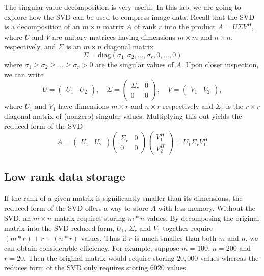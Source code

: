 

The singular value decomposition is very useful.  In this lab, we are going to explore how the SVD can be used to compress image data.  
Recall that the SVD is a decomposition of an $m \times n$ matrix $A$
of rank $r$ into the product $A = U \Sigma V^H$, where $U$ and $V$
are unitary matrices having dimensions $m \times m$ and $n \times n$,
respectively, and $\Sigma$ is an $m \times n$ diagonal matrix
\begin{equation*}
\Sigma = \mbox{diag}(\sigma_1,\sigma_2,\ldots,\sigma_r,0,\ldots,0)
\end{equation*}
where $\sigma_1 \geq \sigma_2 \geq \ldots \geq \sigma_r > 0$ are the
singular values of $A$.  Upon closer inspection, we can write
\begin{equation*}
U = \begin{pmatrix}U_1 & U_2\end{pmatrix}, \quad \Sigma =
\begin{pmatrix}\Sigma_r & 0\\0 & 0\end{pmatrix}, \quad V =
\begin{pmatrix}V_1 & V_2\end{pmatrix},
\end{equation*}
where $U_1$ and $V_1$ have dimensions $m\times r$ and $n\times r$
respectively and $\Sigma_r$ is the $r\times r$ diagonal matrix of
(nonzero) singular values.  Multiplying this out yields the reduced
form of the SVD
\begin{equation*}
A =
\begin{pmatrix}U_1 & U_2\end{pmatrix}
\begin{pmatrix}\Sigma_r & 0\\0 & 0\end{pmatrix}
\begin{pmatrix}V^H_1 \\ V^H_2\end{pmatrix} =
U_1 \Sigma_r V_1^H
\end{equation*}

\subsection*{Low rank data storage}
If the rank of a given matrix is significantly smaller than its
dimensions, the reduced form of the SVD offers a way to store $A$ with less memory.
Without the SVD, an $m\times n$ matrix requires storing $m*n$ values.
By decomposing the original matrix into the SVD reduced form, $U_1$, $\Sigma_r$ and $V_1$ together require $(m*r)+r+(n*r)$ values.
  Thus if $r$ is much smaller than both $m$ and $n$,
we can obtain considerable efficiency.  For example, suppose
$m=100$, $n=200$ and $r=20$. 
Then the original matrix would require storing $20,000$ values whereas the reduces form of the SVD only requires storing $6020$ values.

